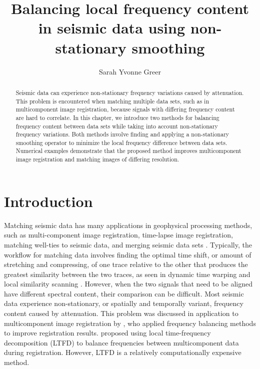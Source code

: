 \renewcommand{\thefootnote}{\fnsymbol{footnote}}
\title{Balancing local frequency content in seismic data using non-stationary smoothing}
\relax{}
\author{Sarah Yvonne Greer}
\maketitle

\begin{abstract}
        Seismic data can experience non-stationary frequency variations caused by attenuation. 
        This problem is encountered when matching multiple data sets, such as in multicomponent image registration, because signals with differing frequency content are hard to correlate. 
        In this chapter, we introduce two methods for balancing frequency content between data sets while taking into account non-stationary frequency variations. 
        Both methods involve finding and applying a non-stationary smoothing operator to minimize the local frequency difference between data sets. 
        Numerical examples demonstrate that the proposed method improves multicomponent image registration and matching images of differing resolution. 
\end{abstract}

\section{Introduction}
        Matching seismic data has many applications in geophysical processing methods, such as multi-component image registration, time-lapse image registration, matching well-ties to seismic data, and merging seismic data sets \cite[]{ps,fomel2003,lumley,herrera2012}.
        Typically, the workflow for matching data involves finding the optimal time shift, or amount of stretching and compressing, of one trace relative to the other that produces the greatest similarity between the two traces, as seen in dynamic time warping and local similarity scanning \cite[]{hale2013, timelapse, herrera}. 
        However, when the two signals that need to be aligned have different spectral content, their comparison can be difficult. 
        Most seismic data experience non-stationary, or spatially and temporally variant, frequency content caused by attenuation. 
        This problem was discussed in application to multicomponent image registration by \cite{fomel2003}, who applied frequency balancing methods to improve registration results. 
        \cite{ltft} proposed using local time-frequency decomposition (LTFD) to balance frequencies between multicomponent data during registration. 
        However, LTFD is a relatively computationally expensive method.
        
